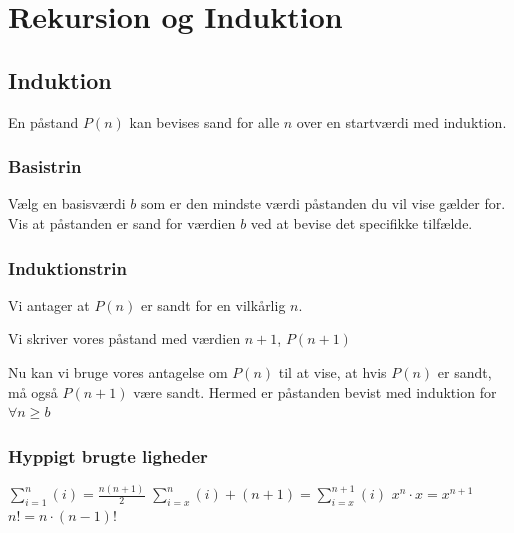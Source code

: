 \section{Rekursion og Induktion}



\subsection{Induktion}
En påstand $P(n)$ kan bevises sand for alle $n$ over en startværdi med induktion.

\subsubsection{Basistrin}
Vælg en basisværdi $b$ som er den mindste værdi påstanden du vil vise gælder for. Vis at påstanden er sand for værdien $b$ ved at bevise det specifikke tilfælde.

\subsubsection{Induktionstrin}
Vi antager at $P(n)$ er sandt for en vilkårlig $n$.

Vi skriver vores påstand med værdien $n+1$, $P(n+1)$

Nu kan vi bruge vores antagelse om $P(n)$ til at vise, at hvis $P(n)$ er sandt, må også $P(n+1)$ være sandt.
Hermed er påstanden bevist med induktion for $\forall n \ge b$

\subsubsection{Hyppigt brugte ligheder}
\begin{center}
    $\sum_{i=1}^{n} (i) = \frac{n(n+1)}{2}$ \hfill
    $\sum_{i=x}^{n} (i) + (n+1) = \sum_{i=x}^{n+1} (i)$ \hfill
    $x^n \cdot x = x^{n+1}$ \hfill
    $n! = n \cdot (n-1)!$
\end{center}